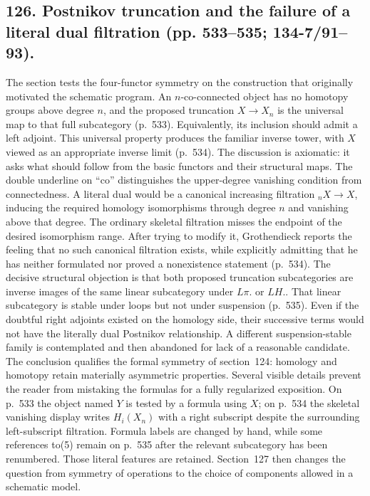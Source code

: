 \documentclass[10pt,oneside]{book}
\begin{document}
\subsection*{126. Postnikov truncation and the failure of a literal dual filtration (pp. 533--535; 134-7/91--93).}
The section tests the four-functor symmetry on the construction that originally motivated the schematic program. An $n$-co-connected object has no homotopy groups above degree $n$, and the proposed truncation $X\to X_n$ is the universal map to that full subcategory (p.~533). Equivalently, its inclusion should admit a left adjoint. This universal property produces the familiar inverse tower, with $X$ viewed as an appropriate inverse limit (p.~534). The discussion is axiomatic: it asks what should follow from the basic functors and their structural maps. The double underline on ``co'' distinguishes the upper-degree vanishing condition from connectedness. A literal dual would be a canonical increasing filtration ${}_nX\to X$, inducing the required homology isomorphisms through degree $n$ and vanishing above that degree. The ordinary skeletal filtration misses the endpoint of the desired isomorphism range. After trying to modify it, Grothendieck reports the feeling that no such canonical filtration exists, while explicitly admitting that he has neither formulated nor proved a nonexistence statement (p.~534). The decisive structural objection is that both proposed truncation subcategories are inverse images of the same linear subcategory under $L\pi.$ or $LH.$. That linear subcategory is stable under loops but not under suspension (p.~535). Even if the doubtful right adjoints existed on the homology side, their successive terms would not have the literally dual Postnikov relationship. A different suspension-stable family is contemplated and then abandoned for lack of a reasonable candidate. The conclusion qualifies the formal symmetry of section~124: homology and homotopy retain materially asymmetric properties. Several visible details prevent the reader from mistaking the formulas for a fully regularized exposition. On p.~533 the object named $Y$ is tested by a formula using $X$; on p.~534 the skeletal vanishing display writes $H_i(X_n)$ with a right subscript despite the surrounding left-subscript filtration. Formula labels are changed by hand, while some references to(5) remain on p.~535 after the relevant subcategory has been renumbered. Those literal features are retained. Section~127 then changes the question from symmetry of operations to the choice of components allowed in a schematic model.
\end{document}
